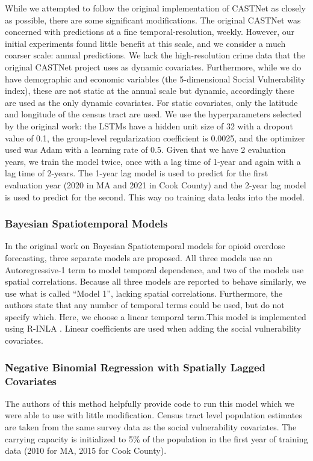 While we attempted to follow the original implementation of CASTNet \citep{ertugrulCASTNetCommunityAttentiveSpatioTemporal2019} as closely as possible, there are some significant modifications. The original CASTNet was concerned with predictions at a fine temporal-resolution, weekly. However, our initial experiments found little benefit at this scale, and we consider a much coarser scale: annual predictions. We lack the high-resolution crime data that the original CASTNet project uses as dynamic covariates. Furthermore, while we do have demographic and economic variables (the 5-dimensional Social Vulnerability index), these are not static at the annual scale but dynamic, accordingly these are used as the only dynamic covariates. For static covariates, only the latitude and longitude of the census tract are used. We use the hyperparameters selected by the original work: the LSTMs have a hidden unit size of 32 with a dropout value of 0.1, the group-level regularization coefficient is 0.0025, and the optimizer used was Adam with a learning rate of 0.5. Given that we have 2 evaluation years, we train the model twice, once with a lag time of 1-year and again with a lag time of 2-years. The 1-year lag model is used to predict for the first evaluation year (2020 in MA and 2021 in Cook County) and the 2-year lag model is used to predict for the second. This way no training data leaks into the model.

\subsubsection{Bayesian Spatiotemporal Models}\label{bayesian-spatiotemporal-models}

In the original work \citep{bauerSmallAreaForecasting2023} on Bayesian Spatiotemporal models for opioid overdose forecasting, three separate models are proposed. All three models use an Autoregressive-1 term to model temporal dependence, and two of the models use spatial correlations. Because all three models are reported to behave similarly, we use what is called ``Model 1'', lacking spatial correlations. Furthermore, the authors state that any number of temporal terms could be used, but do not specify which. Here, we choose a linear temporal term.This model is implemented using R-INLA \citep{rueApproximateBayesianInference2009}. Linear coefficients are used when adding the social vulnerability covariates.

\subsubsection{Negative Binomial Regression with Spatially Lagged Covariates}\label{negative-binomial-regression-with-spatially-lagged-covariates}

The authors of this method \citep{marksIdentifyingCountiesRisk2021} helpfully provide code to run this model which we were able to use with little modification. Census tract level population estimates are taken from the same survey data as the social vulnerability covariates. The carrying capacity is initialized to 5\% of the population in the first year of training data (2010 for MA, 2015 for Cook County).
